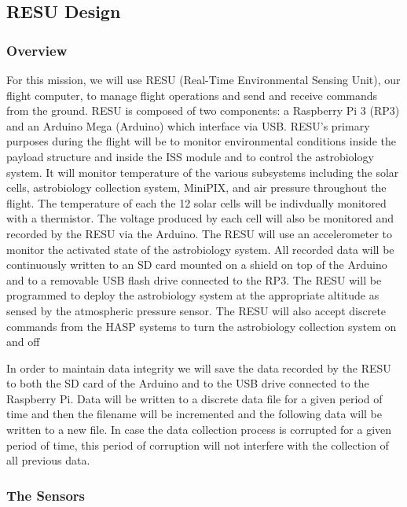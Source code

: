 \subsection{RESU Design}
\label{sec:ElectronicsDesign}

\subsubsection{Overview}

For this mission, we will use RESU (Real-Time Environmental Sensing Unit), our flight computer, to manage flight operations and send and receive commands from the ground. RESU is composed of two components: a Raspberry Pi 3 (RP3) and an Arduino Mega (Arduino) which interface via USB. RESU's primary purposes during the flight will be to monitor environmental conditions inside the payload structure and inside the ISS module and to control the astrobiology system. It will monitor temperature of the various subsystems including the solar cells, astrobiology collection system, MiniPIX, and air pressure throughout the flight. The temperature of each the 12 solar cells will be indivdually monitored with a thermistor. The voltage produced by each cell will also be monitored and recorded by the RESU via the Arduino. The RESU will use an accelerometer to monitor the activated state of the astrobiology system. All recorded data will be continuously written to an SD card mounted on a shield on top of the Arduino and to a removable USB flash drive connected to the RP3. The RESU will be programmed to deploy the astrobiology system at the appropriate altitude as sensed by the atmospheric pressure sensor. The RESU will also accept discrete commands from the HASP systems to turn the astrobiology collection system on and off

In order to maintain data integrity we will save the data recorded by the RESU to both the SD card of the Arduino and to the USB drive connected to the Raspberry Pi. Data will be written to a discrete data file for a given period of time and then the filename will be incremented and the following data will be written to a new file. In case the data collection process is corrupted for a given period of time, this period of corruption will not interfere with the collection of all previous data. 

\subsubsection{The Sensors}

